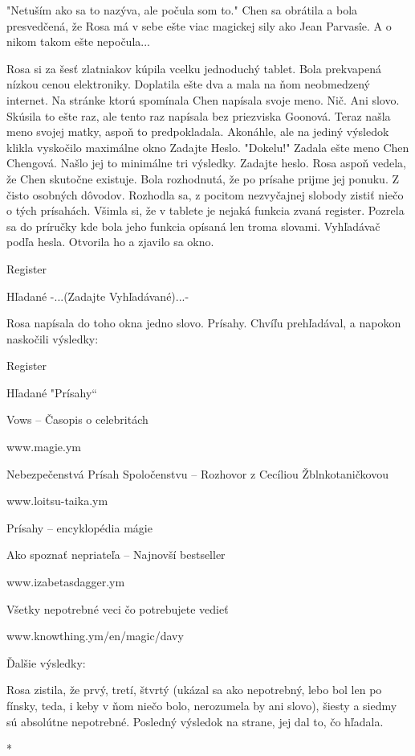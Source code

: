 \documentclass{book}
\begin{document}
"$ $Netuším ako sa to nazýva, ale počula som to."$ $ Chen sa obrátila a bola presvedčená, že Rosa má v sebe ešte viac magickej sily ako Jean Parvasîe. A o nikom takom ešte nepočula...

Rosa si za šesť zlatniakov kúpila vcelku jednoduchý tablet. Bola prekvapená nízkou cenou elektroniky. Doplatila ešte dva a mala na ňom neobmedzený internet. Na stránke ktorú spomínala Chen napísala svoje meno. Nič. Ani slovo. Skúsila to ešte raz, ale tento raz napísala bez priezviska Goonová. Teraz našla meno svojej matky, aspoň to predpokladala. Akonáhle, ale na jediný výsledok klikla vyskočilo maximálne okno Zadajte Heslo. "$ $Dokelu!"$ $ Zadala ešte meno Chen Chengová. Našlo jej to minimálne tri výsledky. Zadajte heslo. Rosa aspoň vedela, že Chen skutočne existuje. Bola rozhodnutá, že po prísahe prijme jej ponuku. Z čisto osobných dôvodov. Rozhodla sa, z pocitom nezvyčajnej slobody zistiť niečo o tých prísahách. Všimla si, že v tablete je nejaká funkcia zvaná register. Pozrela sa do príručky kde bola jeho funkcia opísaná len troma slovami. Vyhľadávač podľa hesla. Otvorila ho a zjavilo sa okno.

Register

Hľadané -...(Zadajte Vyhľadávané)...-

Rosa napísala do toho okna jedno slovo. Prísahy. Chvíľu prehľadával, a napokon naskočili výsledky:

Register

Hľadané "$ $Prísahy“

Vows – Časopis o celebritách

www.magie.ym

Nebezpečenstvá Prísah Spoločenstvu – Rozhovor z Cecíliou Žblnkotaničkovou

www.loitsu-taika.ym

Prísahy – encyklopédia mágie

Ako spoznať nepriateľa – Najnovší bestseller

www.izabetasdagger.ym

Všetky nepotrebné veci čo potrebujete vedieť

www.knowthing.ym/en/magic/davy

Ďalšie výsledky:

Rosa zistila, že prvý, tretí, štvrtý (ukázal sa ako nepotrebný, lebo bol len po fínsky, teda, i keby v ňom niečo bolo, nerozumela by ani slovo), šiesty a siedmy sú absolútne nepotrebné. Posledný výsledok na strane, jej dal to, čo hľadala.

\begin{center}
*
\end{center}
\end{document}
